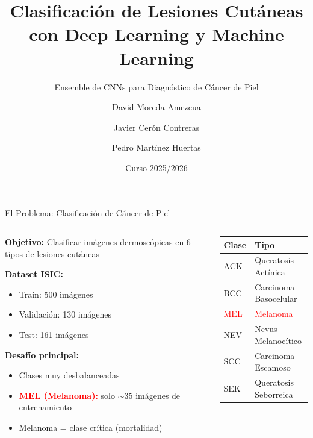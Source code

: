 \documentclass[aspectratio=169]{beamer}
\title[Clasificación de Lesiones Cutáneas]{Clasificación de Lesiones Cutáneas con Deep Learning y Machine Learning}
\subtitle{Ensemble de CNNs para Diagnóstico de Cáncer de Piel}
\author{David Moreda Amezcua \and Javier Cerón Contreras \and Pedro Martínez Huertas}
\institute{Máster Universitario en Inteligencia Artificial\\Universidad Loyola}
\date{Curso 2025/2026}
\begin{document}
\begin{frame}
    \titlepage
\end{frame}

\begin{frame}{El Problema: Clasificación de Cáncer de Piel}

    \begin{columns}[T]
        \begin{column}{0.55\textwidth}
            \textbf{Objetivo:} Clasificar imágenes dermoscópicas en 6 tipos de lesiones cutáneas

            \vspace{0.3cm}
            \textbf{Dataset ISIC:}
            \begin{itemize}
                \item Train: 500 imágenes
                \item Validación: 130 imágenes
                \item Test: 161 imágenes
            \end{itemize}

            \vspace{0.3cm}
            \textbf{Desafío principal:}
            \begin{itemize}
                \item Clases muy desbalanceadas
                \item \textcolor{red}{\textbf{MEL (Melanoma):}} solo $\sim$35 imágenes de entrenamiento
                \item Melanoma = clase crítica (mortalidad)
            \end{itemize}
        \end{column}

        \begin{column}{0.42\textwidth}
            \small
            \begin{tabular}{ll}
                \toprule
                \textbf{Clase} & \textbf{Tipo} \\
                \midrule
                ACK & Queratosis Actínica \\
                BCC & Carcinoma Basocelular \\
                \textcolor{red}{MEL} & \textcolor{red}{Melanoma} \\
                NEV & Nevus Melanocítico \\
                SCC & Carcinoma Escamoso \\
                SEK & Queratosis Seborreica \\
                \bottomrule
            \end{tabular}


\end{column}
\end{columns}
\end{frame}
\end{document}

